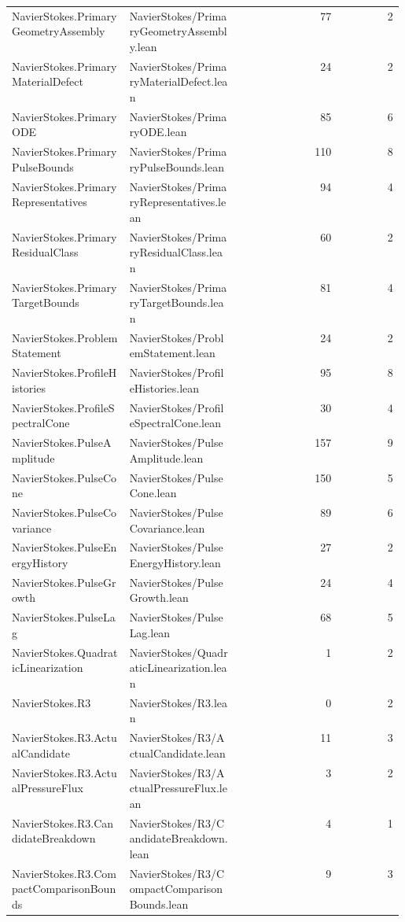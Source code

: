 \begin{longtable}{p{0.30\linewidth}p{0.28\linewidth}rr}
NavierStokes.PrimaryGeometryAssembly & NavierStokes/PrimaryGeometryAssembly.lean & 77 & 2\\
NavierStokes.PrimaryMaterialDefect & NavierStokes/PrimaryMaterialDefect.lean & 24 & 2\\
NavierStokes.PrimaryODE & NavierStokes/PrimaryODE.lean & 85 & 6\\
NavierStokes.PrimaryPulseBounds & NavierStokes/PrimaryPulseBounds.lean & 110 & 8\\
NavierStokes.PrimaryRepresentatives & NavierStokes/PrimaryRepresentatives.lean & 94 & 4\\
NavierStokes.PrimaryResidualClass & NavierStokes/PrimaryResidualClass.lean & 60 & 2\\
NavierStokes.PrimaryTargetBounds & NavierStokes/PrimaryTargetBounds.lean & 81 & 4\\
NavierStokes.ProblemStatement & NavierStokes/ProblemStatement.lean & 24 & 2\\
NavierStokes.ProfileHistories & NavierStokes/ProfileHistories.lean & 95 & 8\\
NavierStokes.ProfileSpectralCone & NavierStokes/ProfileSpectralCone.lean & 30 & 4\\
NavierStokes.PulseAmplitude & NavierStokes/PulseAmplitude.lean & 157 & 9\\
NavierStokes.PulseCone & NavierStokes/PulseCone.lean & 150 & 5\\
NavierStokes.PulseCovariance & NavierStokes/PulseCovariance.lean & 89 & 6\\
NavierStokes.PulseEnergyHistory & NavierStokes/PulseEnergyHistory.lean & 27 & 2\\
NavierStokes.PulseGrowth & NavierStokes/PulseGrowth.lean & 24 & 4\\
NavierStokes.PulseLag & NavierStokes/PulseLag.lean & 68 & 5\\
NavierStokes.QuadraticLinearization & NavierStokes/QuadraticLinearization.lean & 1 & 2\\
NavierStokes.R3 & NavierStokes/R3.lean & 0 & 2\\
NavierStokes.R3.ActualCandidate & NavierStokes/R3/ActualCandidate.lean & 11 & 3\\
NavierStokes.R3.ActualPressureFlux & NavierStokes/R3/ActualPressureFlux.lean & 3 & 2\\
NavierStokes.R3.CandidateBreakdown & NavierStokes/R3/CandidateBreakdown.lean & 4 & 1\\
NavierStokes.R3.CompactComparisonBounds & NavierStokes/R3/CompactComparisonBounds.lean & 9 & 3\\

\end{longtable}
